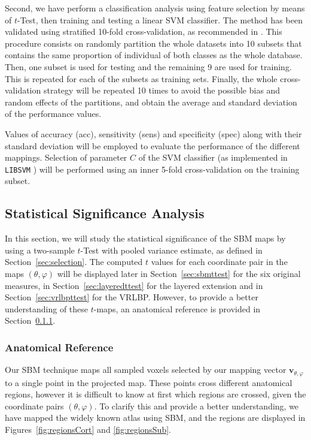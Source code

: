 Second, we have perform a classification analysis using feature selection by means of $t$-Test, then training and testing a linear SVM classifier. The method has been validated using
stratified 10-fold cross-validation, as recommended in \cite{Kohavi1995a}.  This procedure consists on randomly partition the whole datasets into 10 subsets that contains the same proportion of individual of both classes as the whole database. Then, one subset is used for testing and the remaining 9 are used for training. This is repeated for each of the subsets as training sets. Finally, the whole cross-validation strategy will be repeated 10 times to avoid the possible bias and random effects of the partitions, and obtain the average and standard deviation of the performance values. 

Values of accuracy (acc), sensitivity (sens) and specificity (spec) along with their standard deviation  will be employed to evaluate the performance of the different mappings. Selection of parameter $C$ of the SVM classifier (as implemented in \texttt{LIBSVM} \cite{Chang2001}) will be performed using an inner 5-fold cross-validation on the training subset. 

\subsection{Statistical Significance Analysis}\label{sec:significance}
In this section, we will study the statistical significance of the \ac{SBM} maps by using a two-sample $t$-Test with pooled variance estimate, as defined in Section~\ref{sec:selection}. The computed $t$ values for each coordinate pair in the maps $(\theta,\varphi)$ will be displayed later in Section~\ref{sec:sbmttest} for the six original measures, in Section~\ref{sec:layeredttest} for the layered extension and in Section~\ref{sec:vrlbpttest} for the VRLBP. However, to provide a better understanding of these $t$-maps, an anatomical reference is provided in Section~\ref{sec:anatomical}.

\subsubsection{Anatomical Reference}\label{sec:anatomical}
Our \ac{SBM} technique maps all sampled voxels selected by our mapping vector $\mathbf{v}_{\theta,\varphi}$ to a single point in the projected map. These points cross different anatomical regions, however it is difficult to know at first which regions are crossed, given the coordinate pairs $(\theta,\varphi)$. To clarify this and provide a better understanding, we have mapped the widely known \cite{AAL} atlas \cite{Tzourio-Mazoyer2002} using \ac{SBM}, and the regions are displayed in Figures~\ref{fig:regionsCort} and \ref{fig:regionsSub}. 

